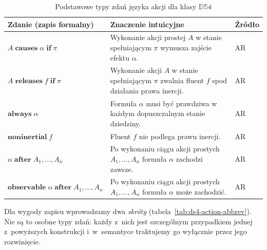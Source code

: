 \documentclass[11pt,a4paper]{article}
\theoremstyle{definition}
\begin{document}
\begin{table}[ht]
\centering
\caption{Podstawowe typy zdań języka akcji dla klasy $\mathbb{DS4}$}
\label{tab:ds4-action-language}
\renewcommand{\arraystretch}{1.2}
\begin{tabular}{|p{}|p{}|p{}|}
\hline
\textbf{Zdanie (zapis formalny)} & \textbf{Znaczenie intuicyjne} & \textbf{Źródło} \\ \hline

$A \;\textbf{causes}\; \alpha \;\textbf{if}\; \pi$ &
Wykonanie akcji prostej $A$ w stanie spełniającym $\pi$ wymusza zajście efektu $\alpha$. &
AR \\ \hline

$A \;\textbf{releases}\; f \;\textbf{if}\; \pi$ &
Wykonanie akcji $A$ w stanie spełniającym $\pi$ zwalnia fluent $f$ spod działania prawa inercji. &
AR \\ \hline

$\textbf{always}\; \alpha$ &
Formuła $\alpha$ musi być prawdziwa w każdym dopuszczalnym stanie dziedziny. &
AR \\ \hline

$\textbf{noninertial}\; f$ &
Fluent $f$ nie podlega prawu inercji. &
AR \\ \hline

$\alpha \;\textbf{after}\; A_1,\dots,A_n$ &
Po wykonaniu ciągu akcji prostych $A_1,\dots,A_n$ formuła $\alpha$ zachodzi zawsze. &
AR \\ \hline

$\textbf{observable}\; \alpha \;\textbf{after}\; A_1,\dots,A_n$ &
Po wykonaniu ciągu akcji prostych $A_1,\dots,A_n$ formuła $\alpha$ może zachodzić. &
AR \\ \hline

\end{tabular}
\end{table}

Dla wygody zapisu wprowadzamy dwa \emph{skróty} (tabela~\ref{tab:ds4-action-abbrev}). Nie są to osobne typy zdań: każdy z~nich jest szczególnym przypadkiem jednej z~powyższych konstrukcji i~w~semantyce traktujemy go wyłącznie przez jego rozwinięcie.
\end{document}
